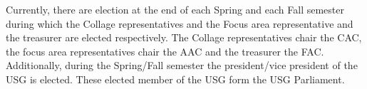 Currently, there are election at the end of each Spring and each Fall semester during which the Collage representatives and the Focus area representative and the treasurer are elected respectively. The Collage representatives chair the CAC, the focus area representatives chair the AAC and the treasurer the FAC. Additionally, during the Spring/Fall semester the president/vice president of the USG is elected. These elected member of the USG form the USG Parliament.